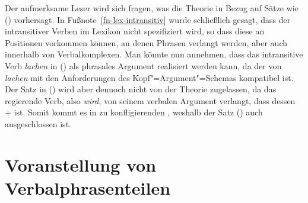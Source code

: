 \noindent
Der aufmerksame Leser wird sich fragen, was die Theorie in Bezug auf Sätze wie () vorhersagt.%
\z
In Fußnote~\ref{fn-lex-intransitiv} wurde schließlich gesagt, dass der \lexw intransitiver Verben
im Lexikon nicht spezifiziert wird, so dass diese an Positionen vorkommen können, an denen Phrasen
verlangt werden, aber auch innerhalb von Verbalkomplexen. Man könnte nun annehmen, dass das intransitive Verb
\emph{lachen} in () als phrasales Argument realisiert werden kann, da der \lexw von \emph{lachen}
mit den Anforderungen des Kopf"=Argument"=Schemas kompatibel ist. Der Satz in () wird aber dennoch
nicht von der Theorie zugelassen, da das regierende Verb, also \emph{wird}, von seinem verbalen Argument verlangt,
dass dessen \lexw + ist. Somit kommt es in \kasen zu konfligierenden \lexwen, 
weshalb der Satz () auch ausgeschlossen ist.


\section{Voranstellung von Verbalphrasenteilen}
\label{sec-pvp}

